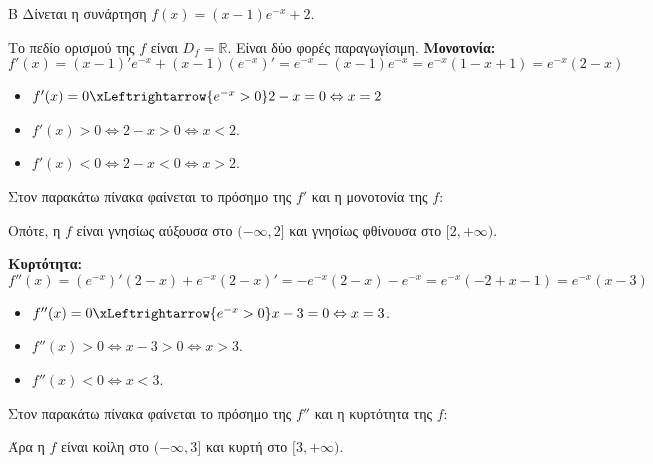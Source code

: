 \begin{thema}{Β}
Δίνεται η συνάρτηση $f(x) = (x-1)e^{-x} + 2$.

\begin{erwthma}
\item Το πεδίο ορισμού της $f$ είναι $D_f = \mathbb{R}$. Είναι δύο φορές παραγωγίσιμη.
\textbf{Μονοτονία:}
\[ f'(x) = (x-1)'e^{-x} + (x-1)(e^{-x})' = e^{-x} - (x-1)e^{-x} = e^{-x}(1 - x + 1) = e^{-x}(2-x) \]
\begin{itemize}
\item $f'(x)=0\xLeftrightarrow{e^{-x}>0} 2-x=0\Leftrightarrow x=2$
\item $f'(x) > 0 \Leftrightarrow 2-x > 0 \Leftrightarrow x < 2$.
\item $f'(x) < 0 \Leftrightarrow 2-x < 0 \Leftrightarrow x > 2$.
\end{itemize}
Στον παρακάτω πίνακα φαίνεται το πρόσημο της $f'$ και η μονοτονία της $f$:
\begin{center}
\end{center}
Οπότε, η $f$ είναι γνησίως αύξουσα στο $(-\infty, 2]$ και γνησίως φθίνουσα στο $[2, +\infty)$.

\textbf{Κυρτότητα:}
\[ f''(x) = (e^{-x})'(2-x) + e^{-x}(2-x)' = -e^{-x}(2-x) - e^{-x} = e^{-x}(-2+x-1) = e^{-x}(x-3) \]
\begin{itemize}
\item $f''(x)=0\xLeftrightarrow{e^{-x}>0}x-3=0\Leftrightarrow x=3$.
\item $f''(x) > 0 \Leftrightarrow x-3 > 0 \Leftrightarrow x > 3$.
\item $f''(x) < 0 \Leftrightarrow x < 3$.
\end{itemize}

Στον παρακάτω πίνακα φαίνεται το πρόσημο της $f''$ και η κυρτότητα της $f$:
\begin{center}
\end{center}
Άρα η $f$ είναι κοίλη στο $(-\infty, 3]$ και κυρτή στο $[3, +\infty)$.


\end{erwthma}
\end{thema}
